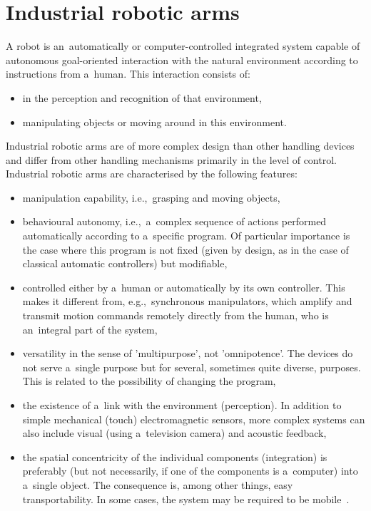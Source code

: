 \section{Industrial robotic arms}

A robot is an~automatically or computer-controlled integrated system capable of autonomous goal-oriented interaction with the natural environment according to instructions from a~human. This interaction consists of:

\begin{itemize}

    \item in the perception and recognition of that environment,
    \item manipulating objects or moving around in this environment. 

\end{itemize}

 Industrial robotic arms are of more complex design than other handling devices and differ from other handling mechanisms primarily in the level of control.  Industrial robotic arms are characterised by the following features:
 
\begin{itemize}
 
    \item  manipulation capability, i.e.,~grasping and moving objects, 
    \item behavioural autonomy, i.e.,~a~complex sequence of actions performed automatically according to a~specific program. Of particular importance is the case where this program is not fixed (given by design, as in the case of classical automatic controllers) but modifiable,
    \item controlled either by a~human or automatically by its own controller.  This makes it different from, e.g.,~synchronous manipulators, which amplify and transmit motion commands remotely directly from the human, who is an~integral part of the system,
    \item versatility in the sense of 'multipurpose', not 'omnipotence'. The devices do not serve a~single purpose but for several, sometimes quite diverse, purposes. This is related to the possibility of changing the program,
    \item the existence of a~link with the environment (perception). In addition to simple mechanical (touch) electromagnetic sensors, more complex systems can also include visual (using a~television camera) and acoustic feedback,
    \item the spatial concentricity of the individual components (integration) is preferably (but not necessarily, if one of the components is a~computer) into a~single object. The consequence is, among other things, easy transportability. In some cases, the system may be required to be mobile~\cite{vsb_2007}.

\end{itemize}

